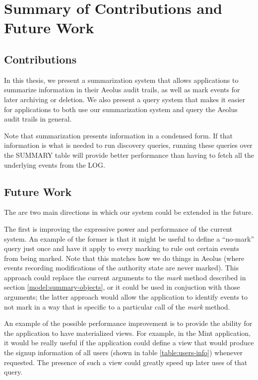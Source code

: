 \chapter{Summary of Contributions and Future Work}

\section{Contributions}

In this thesis, we present a summarization system that allows applications to summarize information in their Aeolus audit trails, as well as mark events for later archiving or deletion. We also present a query system that makes it easier for applications to both use our summarization system and query the Aeolus audit trails in general.

Note that summarization presents information in a condensed form. If that information is what is needed to run discovery queries, running these queries over the SUMMARY table will provide better performance than having to fetch all the underlying events from the LOG.

\section{Future Work}

The are two main directions in which our system could be extended in the future.

The first is improving the expressive power and performance of the current system. An example of the former is that it might be useful to define a ``no-mark'' query just once and have it apply to every marking to rule out certain events from being marked. Note that this matches how we do things in Aeolus (where events recording modifications of the authority state are never marked). This approach could replace the current arguments to the \emph{mark} method described in section \ref{model:summary-objects}, or it could be used in conjuction with those arguments; the latter approach would allow the application to identify events to not mark in a way that is specific to a particular call of the \emph{mark} method.

An example of the possible performance improvement is to provide the ability for the application to have materialized views. For example, in the Mint application, it would be really useful if the application could define a view that would produce the signup information of all users (shown in table \ref{table:users-info}) whenever requested. The presence of such a view could greatly speed up later uses of that query.

